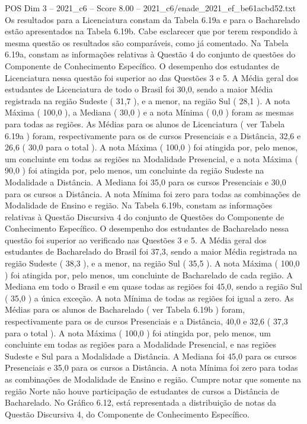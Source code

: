 \begin{textsample}{POS Dim 3 – 2021\_c6 – Score 8.00 – 2021\_c6/enade\_2021\_ef\_be61acbd52.txt}
Os resultados para a Licenciatura constam da Tabela 6.19a e para o Bacharelado estão apresentados na Tabela 6.19b.
Cabe esclarecer que por terem respondido à mesma questão os resultados são comparáveis, como já comentado.
Na Tabela 6.19a, constam as informações relativas à Questão 4 do conjunto de questões do Componente de Conhecimento Específico.
O desempenho dos estudantes de Licenciatura nessa questão foi superior ao das Questões 3 e 5.
A Média geral dos estudantes de Licenciatura de todo o Brasil foi 30,0, sendo a maior Média registrada na região Sudeste ( 31,7 ), e a menor, na região Sul ( 28,1 ).
A nota Máxima ( 100,0 ), a Mediana ( 30,0 ) e a nota Mínima ( 0,0 ) foram as mesmas para todas as regiões.
As Médias para os alunos de Licenciatura ( ver Tabela 6.19a ) foram, respectivamente para os de cursos Presenciais e a Distância, 32,6 e 26,6 ( 30,0 para o total ).
A nota Máxima ( 100,0 ) foi atingida por, pelo menos, um concluinte em todas as regiões na Modalidade Presencial, e a nota Máxima ( 90,0 ) foi atingida por, pelo menos, um concluinte da região Sudeste na Modalidade a Distância.
A Mediana foi 35,0 para os cursos Presenciais e 30,0 para os cursos a Distância.
A nota Mínima foi zero para todas as combinações de Modalidade de Ensino e região.
Na Tabela 6.19b, constam as informações relativas à Questão Discursiva 4 do conjunto de Questões do Componente de Conhecimento Específico.
O desempenho dos estudantes de Bacharelado nessa questão foi superior ao verificado nas Questões 3 e 5.
A Média geral dos estudantes de Bacharelado do Brasil foi 37,3, sendo a maior Média registrada na região Sudeste ( 38,3 ), e a menor, na região Sul ( 35,5 ).
A nota Máxima ( 100,0 ) foi atingida por, pelo menos, um concluinte de Bacharelado de cada região.
A Mediana em todo o Brasil e em quase todas as regiões foi 45,0, sendo a região Sul ( 35,0 ) a única exceção.
A nota Mínima de todas as regiões foi igual a zero.
As Médias para os alunos de Bacharelado ( ver Tabela 6.19b ) foram, respectivamente para os de cursos Presenciais e a Distância, 40,0 e 32,6 ( 37,3 para o total ).
A nota Máxima ( 100,0 ) foi atingida por, pelo menos, um concluinte em todas as regiões para a Modalidade Presencial, e nas regiões Sudeste e Sul para a Modalidade a Distância.
A Mediana foi 45,0 para os cursos Presenciais e 35,0 para os cursos a Distância.
A nota Mínima foi zero para todas as combinações de Modalidade de Ensino e região.
Cumpre notar que somente na região Norte não houve participação de estudantes de cursos a Distância de Bacharelado.
No Gráfico 6.12, está representada a distribuição de notas da Questão Discursiva 4, do Componente de Conhecimento Específico.

\end{textsample}
